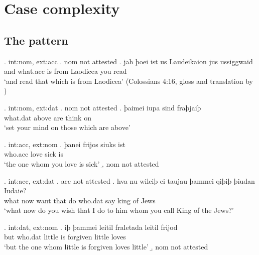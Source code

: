 
\chapter{Case complexity}

\section{The pattern}

\ex. \ac{int}:\ac{nom}, \ac{ext}:\ac{acc}
\a. \ac{nom} not attested
\bg. jah þoei ist us Laudeikaion jus ussiggwaid\\
 and what.\ac{acc} is\scsub{[nom]} from Laodicea you read\scsub{[acc]}\\
 `and read that which is from Laodicea' \hfill (Colossians 4:16, gloss and translation by \citealt[357]{harbert1978})

\ex. \ac{int}:\ac{nom}, \ac{ext}:\ac{dat}
\a. \ac{nom} not attested
\bg. þaimei iupa sind fraþjaiþ\\
 what.\ac{dat} above are\scsub{[nom]} {think on}\scsub{[dat]}\\
 `set your mind on those which are above' 

\ex. \ac{int}:\ac{acc}, \ac{ext}:\ac{nom}
\ag. þanei frijos siuks ist\\
 who.\ac{acc} love\scsub{[acc]} sick is\scsub{[nom]}\\
 `the one whom you love is sick' 
\b. \ac{nom} not attested

\ex. \ac{int}:\ac{acc}, \ac{ext}:\ac{dat}
\a. \ac{acc} not attested
\bg. hva nu wileiþ ei taujau þammei qiþiþ þiudan Iudaie?\\
 what now want that do\scsub{[dat]} who.\ac{dat} say\scsub{[acc]} king {of Jews}\\
 `what now do you wish that I do to him whom you call King of the Jews?' 

\ex. \ac{int}:\ac{dat}, \ac{ext}:\ac{nom}
\ag. iþ þammei leitil fraletada leitil frijod\\
 but who.\ac{dat} little {is forgiven\scsub{[dat]}} little loves\scsub{[nom]}\\
 `but the one whom little is forgiven loves little' 
\b. \ac{nom} not attested


